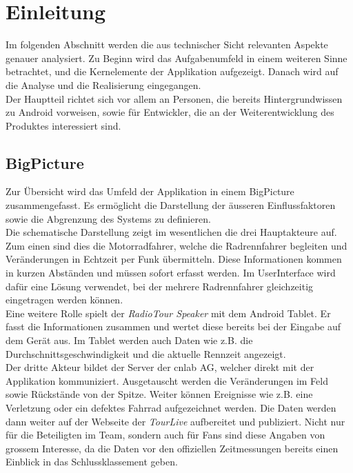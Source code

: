 \chapter{Einleitung}

Im folgenden Abschnitt werden die aus technischer Sicht relevanten Aspekte genauer analysiert. Zu Beginn wird das Aufgabenumfeld in einem weiteren Sinne betrachtet, und die Kernelemente der Applikation aufgezeigt. Danach wird auf die Analyse und die Realisierung eingegangen.
\\
Der Hauptteil richtet sich vor allem an Personen, die bereits Hintergrundwissen zu Android vorweisen, sowie für Entwickler, die an der Weiterentwicklung des Produktes interessiert sind.

\section{BigPicture}
Zur Übersicht wird das Umfeld der Applikation in einem BigPicture zusammengefasst. Es ermöglicht die Darstellung der äusseren Einflussfaktoren sowie die Abgrenzung des Systems zu definieren.
\\
Die schematische Darstellung zeigt im wesentlichen die drei Hauptakteure auf. Zum einen sind dies die Motorradfahrer, welche die Radrennfahrer begleiten und Veränderungen in Echtzeit per Funk übermitteln. Diese Informationen kommen in kurzen Abständen und müssen sofort erfasst werden. Im UserInterface wird dafür eine Lösung verwendet, bei der mehrere Radrennfahrer gleichzeitig eingetragen werden können.
\\
Eine weitere Rolle spielt der \textit{RadioTour Speaker} mit dem Android Tablet. Er fasst die Informationen zusammen und wertet diese bereits bei der Eingabe auf dem Gerät aus. Im Tablet werden auch Daten wie z.B. die Durchschnittsgeschwindigkeit und die aktuelle Rennzeit angezeigt.
\\
Der dritte Akteur bildet der Server der cnlab AG, welcher direkt mit der Applikation kommuniziert. Ausgetauscht werden die Veränderungen im Feld sowie Rückstände von der Spitze. Weiter können Ereignisse wie z.B. eine Verletzung oder ein defektes Fahrrad aufgezeichnet werden. Die Daten werden dann weiter auf der Webseite der \textit{TourLive} aufbereitet und publiziert. Nicht nur für die Beteiligten im Team, sondern auch für Fans sind diese Angaben von grossem Interesse, da die Daten vor den offiziellen Zeitmessungen bereits einen Einblick in das Schlussklassement geben.

\newpage

